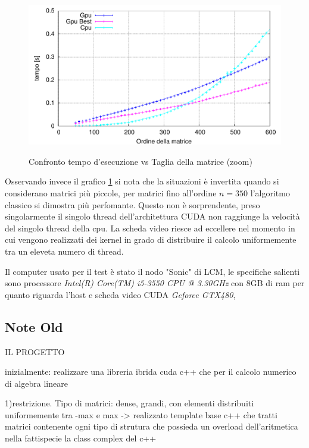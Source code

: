 \documentclass{article}
\begin{document}
\begin{figure}[ht!]
	\centering
	\caption{Confronto tempo d'esecuzione vs Taglia della matrice (zoom)}
	\includegraphics[width=180mm]{TimevsN_Zoom.pdf}
	\label{Zoom}
\end{figure}
Osservando invece il grafico \ref{Zoom} si nota che la situazioni è invertita quando si considerano matrici più piccole, per matrici fino all'ordine $n = 350$ l'algoritmo classico si dimostra più perfomante. Questo non è sorprendente, preso singolarmente il singolo thread dell'architettura CUDA non raggiunge la velocità del singolo thread della cpu.
La scheda video riesce ad eccellere nel momento in cui vengono realizzati dei kernel in grado di distribuire il calcolo uniformemente tra un eleveta numero di thread.


Il computer usato per il test è stato il nodo "Sonic" di LCM, le specifiche salienti sono processore \textit{Intel(R) Core(TM) i5-3550 CPU @ 3.30GHz} con 8GB di ram
per quanto riguarda l'host e scheda video CUDA \textit{Geforce GTX480},






\subsection{Note Old}

IL PROGETTO

inizialmente: realizzare una libreria ibrida cuda c++ che per il calcolo numerico di algebra lineare

1)restrizione. Tipo di matrici: dense, grandi, con elementi distribuiti uniformemente tra -max e max
                -> realizzato template base c++ che tratti matrici contenente ogni tipo di strutura che possieda un overload dell'aritmetica
                        nella fattispecie la class complex del c++
\end{document}

